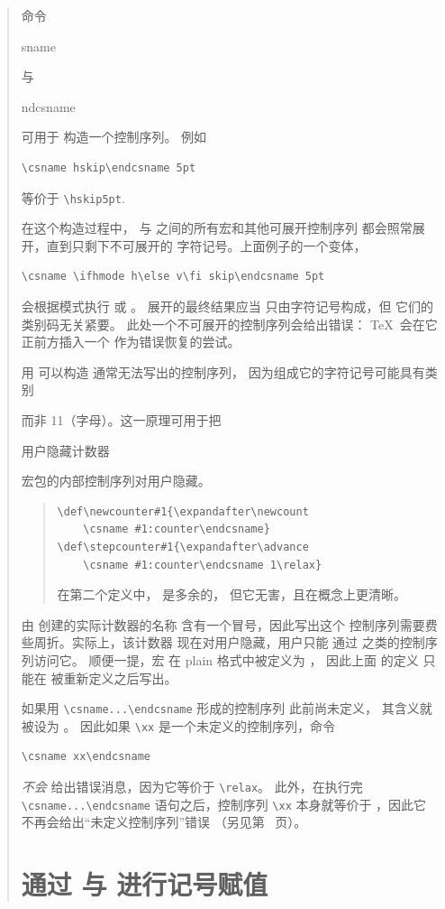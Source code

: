 \documentclass[a4paper]{rapport3}
\makeatletter
\def\alt{}\def\altt{}%
\newenvironment{disp}{\begin{quotation}}{\end{quotation}}
\newenvironment{example}{\begin{quotation}}{\end{quotation}}
\def\howto#1\par{}
\def\cstoidx#1\par{\index{#1@\cs{#1}}}
\def\csidx#1{\cstoidx #1\par\cs{#1}}
\makeatother
\begin{document}
\begin{disp}
命令 \csidx{csname} 与 \csidx{endcsname} 可用于
构造一个控制序列。
例如 \begin{verbatim}
\csname hskip\endcsname 5pt
\end{verbatim}
等价于 \verb=\hskip5pt=.

在这个构造过程中，
 与  之间的所有宏和其他可展开控制序列
都会照常展开，直到只剩下不可展开的
字符记号。上面例子的一个变体，
\begin{verbatim}
\csname \ifhmode h\else v\fi skip\endcsname 5pt
\end{verbatim}
会根据模式执行  或 。
展开的最终结果应当
只由字符记号构成，但
它们的类别码无关紧要。
此处一个不可展开的控制序列会给出错误：
\TeX\ 会在它正前方插入一个 
作为错误恢复的尝试。

用  可以构造
通常无法写出的控制序列，
因为组成它的字符记号可能具有类别
\alt
而非 11（字母）。这一原理可用于把
\howto 对用户隐藏计数器\par
宏包的内部控制序列对用户隐藏。
\begin{example}\begin{verbatim}
\def\newcounter#1{\expandafter\newcount
    \csname #1:counter\endcsname}
\def\stepcounter#1{\expandafter\advance
    \csname #1:counter\endcsname 1\relax}
\end{verbatim}
在第二个定义中， 是多余的，
但它无害，且在概念上更清晰。
\end{example}

由  创建的实际计数器的名称
含有一个冒号，因此写出这个
控制序列需要费些周折。实际上，该计数器
现在对用户隐藏，用户只能
通过  之类的控制序列访问它。
顺便一提，宏  在 plain 格式中被定义为 ，
因此上面  的定义
只能在  被重新定义之后写出。

如果用 \verb>\csname...\endcsname> 形成的控制序列
此前尚未定义，
其含义就被设为 。
因此如果 \verb=\xx= 是一个未定义的控制序列，命令 \begin{verbatim}
\csname xx\endcsname
\end{verbatim}
{\em 不会\/}
给出错误消息，因为它等价于 \verb=\relax=。
此外，在执行完
\verb-\csname...\endcsname- 语句之后，控制序列
\verb=\xx= 本身就等价于 ，因此它
不再会给出“未定义控制序列”错误
（另见第~\pageref{relax:cs} 页）。


\section{通过 \protect{} 与 \protect{} 进行记号赋值}


\end{disp}
\end{document}
